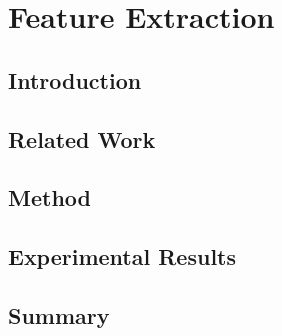 %
\chapter{Feature Extraction}
\label{sec:feature}


\blindtext

\section{Introduction}
\label{sec:feature:intro}

\blindtext

\section{Related Work}
\label{sec:feature:related}

\blindtext

\section{Method}
\label{sec:feature:theory}

\blindtext

\section{Experimental Results}
\label{sec:feature:results}

\blindtext

\section{Summary}
\label{sec:feature:summary}

\blindtext
